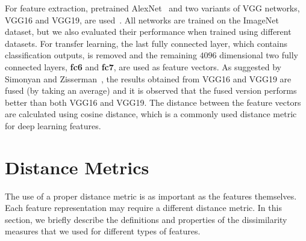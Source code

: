 For feature extraction, pretrained AlexNet~\cite{krizhevsky2012imagenet} and two variants of VGG networks, VGG16 and VGG19, are used~\cite{simonyan2014very}. All networks are trained on the ImageNet~\cite{russakovsky2015imagenet} dataset, but we also evaluated their performance when trained using different datasets. For transfer learning, the last fully connected layer, which contains classification outputs, is removed and the remaining $4096$ dimensional two fully connected layers, \textbf{fc6} and \textbf{fc7}, are used as feature vectors. As suggested by Simonyan and Zisserman~\cite{simonyan2014very}, the results obtained from VGG16 and VGG19 are fused (by taking an average) and it is observed that the fused version performs better than both VGG16 and VGG19. The distance between the feature vectors are calculated using cosine distance, which is a commonly used distance metric for deep learning features. 

\section{Distance Metrics}
The use of a proper distance metric is as important as the features themselves. Each feature representation
may require a different distance metric. In this section, we briefly describe the definitions and properties of the dissimilarity measures that we used for different types of features.
